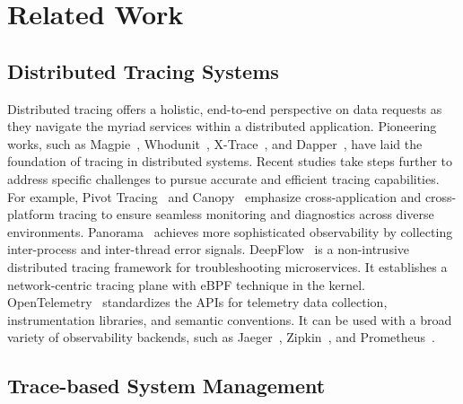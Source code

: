 \section{Related Work}
\label{sec:related_work}

\subsection{Distributed Tracing Systems}

Distributed tracing offers a holistic, end-to-end perspective on data requests as they navigate the myriad services within a distributed application.
Pioneering works, such as Magpie~\cite{DBLP:conf/hotos/BarhamIMN03}, Whodunit~\cite{DBLP:conf/eurosys/ChandaCZ07}, X-Trace~\cite{DBLP:conf/nsdi/FonsecaPKSS07}, and Dapper~\cite{sigelman2010dapper}, have laid the foundation of tracing in distributed systems.
Recent studies take steps further to address specific challenges to pursue accurate and efficient tracing capabilities.
For example, Pivot Tracing~\cite{DBLP:conf/sosp/MaceRF15} and Canopy~\cite{DBLP:conf/sosp/KaldorMBGKOOSSV17} emphasize cross-application and cross-platform tracing to ensure seamless monitoring and diagnostics across diverse environments.
Panorama~\cite{DBLP:conf/osdi/HuangGLZD18} achieves more sophisticated observability by collecting inter-process and inter-thread error signals.
DeepFlow~\cite{DBLP:conf/sigcomm/ShenZXSLSZWY0XL23} is a non-intrusive distributed tracing framework for troubleshooting microservices.
It establishes a network-centric tracing plane with eBPF technique in the kernel. 
OpenTelemetry~\cite{opentelemetry} standardizes the APIs for telemetry data collection, instrumentation libraries, and semantic conventions.
It can be used with a broad variety of observability backends, such as Jaeger~\cite{jaeger}, Zipkin~\cite{zipkin}, and Prometheus~\cite{prometheus}.

\subsection{Trace-based System Management}

